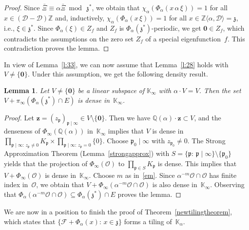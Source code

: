 \documentclass[12pt]{amsart}
\newtheorem{lemma}{Lemma}[section]
\theoremstyle{definition}
\theoremstyle{remark}
\numberwithin{equation}{section}
\begin{document}
\begin{proof}
Since $\bar{\Xi} \equiv \alpha \bar{\Xi} \bmod\, \mathfrak{z}^*$, we obtain that $\chi_\alpha(\Phi_\alpha(x\, \alpha\, \xi)) = 1$ for all $x \in (\mathcal{D} - \mathcal{D}) \mathbb{Z}$ and, inductively, $\chi_\alpha(\Phi_\alpha(x\, \xi)) = 1$ for all $x \in \mathbb{Z}\langle \alpha, \mathcal{D} \rangle = \mathfrak{z}$, i.e., $\xi \in \mathfrak{z}^*$.
Since $\Phi_\alpha(\xi) \in Z_f$ and $Z_f$ is $\Phi_\alpha(\mathfrak{z}^*)$-periodic, we get $\mathbf{0} \in Z_f$, which contradicts the assumptions on the zero set $Z_f$ of a special eigenfunction~$f$.
This contradiction proves the lemma.
\end{proof}

In view of Lemma~\ref{l:33}, we can now assume that Lemma~\ref{l:28} holds with $V \neq \{\mathbf{0}\}$.
Under this assumption, we get the following density result.

\begin{lemma} \label{l:42}
Let $V \neq \{\mathbf{0}\}$ be a linear subspace of $\mathbb{K}_\infty$ with $\alpha \cdot V = V$.
Then the set $V + \pi_\infty(\Phi_\alpha(\mathfrak{z}^*) \cap E)$ is dense in~$\mathbb{K}_\infty$.
\end{lemma}

\begin{proof}
Let $\mathbf{z} = (z_\mathfrak{p})_{\mathfrak{p}\mid\infty} \in V \setminus \{\mathbf{0}\}$.
Then we have $\mathbb{Q}(\alpha) \cdot \mathbf{z} \subset V$, and the denseness of $\Phi_\infty(\mathbb{Q}(\alpha))$ in~$\mathbb{K}_\infty$ implies that $V$ is dense in $\prod_{\mathfrak{p}\mid\infty:\,z_\mathfrak{p}\neq0} K_\mathfrak{p} \times \prod_{\mathfrak{p}\mid\infty:\,z_\mathfrak{p}=0} \{0\}$.
Choose $\mathfrak{p}_0 \mid \infty$ with $z_{\mathfrak{p}_0} \neq 0$.
The Strong Approximation Theorem (Lemma~\ref{strongapprox}) with $S = \{\mathfrak{p}:\, \mathfrak{p} \mid \infty\} \setminus \{\mathfrak{p}_0\}$ yields that the projection of $\Phi_\infty(\mathcal{O})$ to $\prod_{\mathfrak{p}\in S} K_\mathfrak{p}$ is dense.
This implies that $V + \Phi_\infty(\mathcal{O})$ is dense in~$\mathbb{K}_\infty$.
Choose $m$ as in~\eqref{em}.
Since $\alpha^{-m} \mathcal{O} \cap \mathcal{O}$ has finite index in~$\mathcal{O}$, we obtain that $V + \Phi_\infty(\alpha^{-m} \mathcal{O} \cap \mathcal{O})$ is also dense in~$\mathbb{K}_\infty$.
Observing that $\Phi_\alpha(\alpha^{-m} \mathcal{O} \cap \mathcal{O}) \subseteq \Phi_\alpha(\mathfrak{z}^*) \cap E$ proves the lemma.
\end{proof}

We are now in a position to finish the proof of Theorem~\ref{newtilingtheorem},
which states that $\{\mathcal{F} + \Phi_\alpha(x):\, x \in \mathfrak{z}\}$ forms a tiling of~$\mathbb{K}_\alpha$.
\end{document}
